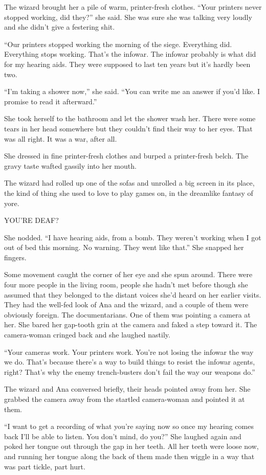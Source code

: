 The wizard brought her a pile of warm, printer-fresh clothes. “Your
printers never stopped working, did they?” she said. She was sure
she was talking very loudly and she didn’t give a festering shit.

“Our printers stopped working the morning of the siege. Everything
did. Everything stops working. That’s the infowar. The infowar
probably is what did for my hearing aids. They were supposed to
last ten years but it’s hardly been two.

“I’m taking a shower now,” she said. “You can write me an answer if
you’d like. I promise to read it afterward.”

She took herself to the bathroom and let the shower wash her. There
were some tears in her head somewhere but they couldn’t find their
way to her eyes. That was all right. It was a war, after all.

She dressed in fine printer-fresh clothes and burped a
printer-fresh belch. The gravy taste wafted gassily into her
mouth.

The wizard had rolled up one of the sofas and unrolled a big screen
in its place, the kind of thing she used to love to play games on,
in the dreamlike fantasy of yore.

YOU’RE DEAF?

She nodded. “I have hearing aids, from a bomb. They weren’t working
when I got out of bed this morning. No warning. They went like
that.” She snapped her fingers.

Some movement caught the corner of her eye and she spun around.
There were four more people in the living room, people she hadn’t
met before though she assumed that they belonged to the distant
voices she’d heard on her earlier visits. They had the well-fed
look of Ana and the wizard, and a couple of them were obviously
foreign. The documentarians. One of them was pointing a camera at
her. She bared her gap-tooth grin at the camera and faked a step
toward it. The camera-woman cringed back and she laughed nastily.

“Your cameras work. Your printers work. You’re not losing the
infowar the way we do. That’s because there’s a way to build things
to resist the infowar agents, right? That’s why the enemy
trench-busters don’t fail the way our weapons do.”

The wizard and Ana conversed briefly, their heads pointed away from
her. She grabbed the camera away from the startled camera-woman and
pointed it at them.

“I want to get a recording of what you’re saying now so once my
hearing comes back I’ll be able to listen. You don’t mind, do you?”
She laughed again and poked her tongue out through the gap in her
teeth. All her teeth were loose now, and running her tongue along
the back of them made then wiggle in a way that was part tickle,
part hurt.

